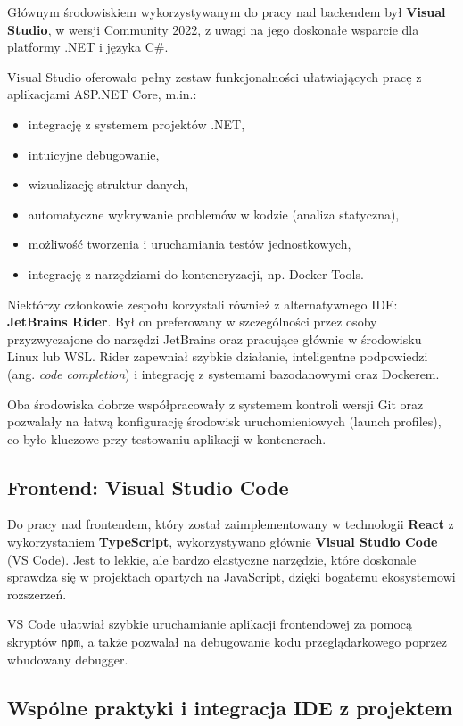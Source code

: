 Głównym środowiskiem wykorzystywanym do pracy nad backendem był \textbf{Visual Studio}, w wersji Community 2022, z uwagi na jego doskonałe wsparcie dla platformy .NET i języka C\#.

Visual Studio oferowało pełny zestaw funkcjonalności ułatwiających pracę z aplikacjami ASP.NET Core, m.in.:
\begin{itemize}
  \item integrację z systemem projektów .NET,
  \item intuicyjne debugowanie,
  \item wizualizację struktur danych,
  \item automatyczne wykrywanie problemów w kodzie (analiza statyczna),
  \item możliwość tworzenia i uruchamiania testów jednostkowych,
  \item integrację z narzędziami do konteneryzacji, np. Docker Tools.
\end{itemize}

Niektórzy członkowie zespołu korzystali również z alternatywnego IDE: \textbf{JetBrains Rider}. Był on preferowany w szczególności przez osoby przyzwyczajone do narzędzi JetBrains oraz pracujące głównie w środowisku Linux lub WSL. Rider zapewniał szybkie działanie, inteligentne podpowiedzi (ang. \textit{code completion}) i integrację z systemami bazodanowymi oraz Dockerem.

Oba środowiska dobrze współpracowały z systemem kontroli wersji Git oraz pozwalały na łatwą konfigurację środowisk uruchomieniowych (launch profiles), co było kluczowe przy testowaniu aplikacji w kontenerach.

\subsection{Frontend: Visual Studio Code}

Do pracy nad frontendem, który został zaimplementowany w technologii \textbf{React} z wykorzystaniem \textbf{TypeScript}, wykorzystywano głównie \textbf{Visual Studio Code} (VS Code). Jest to lekkie, ale bardzo elastyczne narzędzie, które doskonale sprawdza się w projektach opartych na JavaScript, dzięki bogatemu ekosystemowi rozszerzeń.

VS Code ułatwiał szybkie uruchamianie aplikacji frontendowej za pomocą skryptów \texttt{npm}, a także pozwalał na debugowanie kodu przeglądarkowego poprzez wbudowany debugger.

\subsection{Wspólne praktyki i integracja IDE z projektem}

